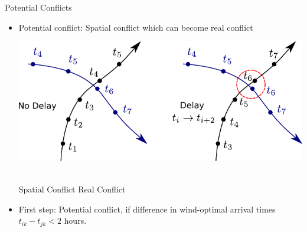 \documentclass[10pt]{beamer}
\begin{document}
\begin{frame}[t]{Potential Conflicts}
    \begin{itemize}
        \item Potential conflict: Spatial conflict which can become real conflict
            \hspace{0.5cm}

            \begin{minipage}[c]{0.9\linewidth}
                \includegraphics[width=1.0\textwidth]{images/potential_conflict.pdf}
                \\ 
            \end{minipage}
            \\
            \hspace{1.0cm}
            Spatial Conflict
            \hspace{3cm}
            Real Conflict
        \item First step: Potential conflict, if difference in wind-optimal arrival times $t_{ik}-t_{jk} < 2 $ hours.
    \end{itemize} 
\end{frame}
\end{document}
